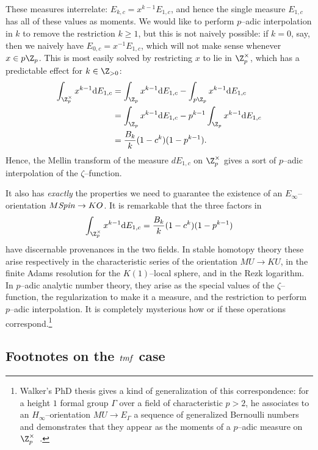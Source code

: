 These measures interrelate: \(E_{k, c} = x^{k-1} E_{1, c}\), and hence the single measure \(E_{1, c}\) has all of these values as moments.  We would like to perform \(p\)--adic interpolation in \(k\) to remove the restriction \(k \ge 1\), but this is not naively possible: if \(k = 0\), say, then we naively have \(E_{0, c} = x^{-1} E_{1, c}\), which will not make sense whenever \(x \in p\Z_p\).  This is most easily solved by restricting \(x\) to lie in \(\Z_p^\times\), which has a predictable effect for \(k \in \Z_{> 0}\):
\begin{align*}
\int_{\Z_p^\times} x^{k-1} \mathrm dE_{1,c} & = \int_{\Z_p} x^{k-1} \mathrm dE_{1,c} - \int_{p\Z_p} x^{k-1} \mathrm dE_{1, c} \\
& = \int_{\Z_p} x^{k-1} \mathrm dE_{1,c} - p^{k-1} \int_{\Z_p} x^{k-1} \mathrm dE_{1, c} \\
& = \frac{B_k}{k}(1 - c^k)(1 - p^{k-1}).
\end{align*}
Hence, the Mellin transform of the measure \(dE_{1,c}\) on \(\Z_p^\times\) gives a sort of \(p\)--adic interpolation of the \(\zeta\)--function.

It also has \emph{exactly} the properties we need to guarantee the existence of an \(E_\infty\)--orientation \(M\mathit{Spin} \to KO\).  It is remarkable that the three factors in \[\int_{\Z_p^\times} x^{k-1} \mathrm d E_{1, c} = \frac{B_k}{k} (1 - c^k)(1 - p^{k-1})\] have discernable provenances in the two fields.  In stable homotopy theory these arise respectively in the characteristic series of the orientation \(MU \to KU\), in the finite Adams resolution for the \(K(1)\)--local sphere, and in the Rezk logarithm.  In \(p\)--adic analytic number theory, they arise as the special values of the \(\zeta\)--function, the regularization to make it a measure, and the restriction to perform \(p\)--adic interpolation.  It is completely mysterious how or if these operations correspond.\footnote{Walker's PhD thesis gives a kind of generalization of this correspondence: for a height \(1\) formal group \(\Gamma\) over a field of characteristic \(p > 2\), he associates to an \(H_\infty\)--orientation \(MU \to E_\Gamma\) a sequence of generalized Bernoulli numbers and demonstrates that they appear as the moments of a \(p\)--adic measure on \(\Z_p^\times\)~\cite{Walker}.}


\subsection{Footnotes on the \(\mathit{tmf}\) case}

